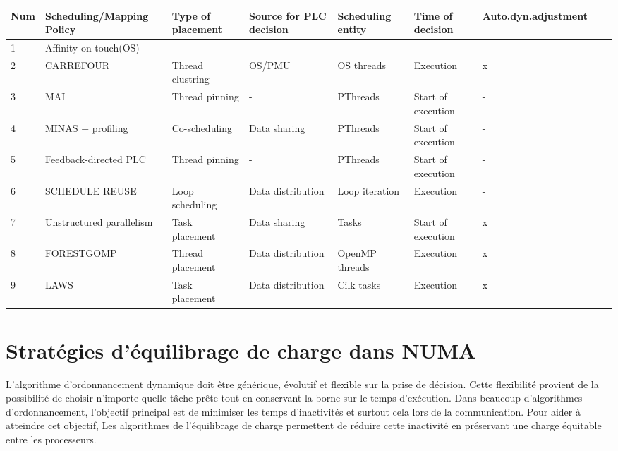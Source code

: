 {\begin{landscape}
\begin{center}
	\begin{tabular}{l *{8}{l}}
		\hline
		{Num} &     {Scheduling/Mapping Policy} &     {Type of placement} &     {Source for PLC decision} &     {Scheduling entity} &     {Time of decision} &     {Auto.dyn.adjustment}\\
		\hline
		1 		& Affinity on touch(OS)		& -    					& -      				& -     				& -      					& -\\
		2         & CARREFOUR                 	& Thread clustring   	& OS/PMU     		& OS threads     	& Execution     		& x\\
		3         & MAI                             	& Thread pinning    	& -      				& PThreads    		& Start of execution   	& -\\
		4         & MINAS + profiling              	& Co-scheduling    	& Data sharing     	& PThreads    		& Start of execution  	& -\\
		5         & Feedback-directed PLC 		& Thread pinning    	& -      				& PThreads     		& Start of execution    	& -\\
		6         & SCHEDULE REUSE            	& Loop scheduling   	& Data distribution & Loop iteration   	& Execution     		& -\\
		7         & Unstructured parallelism  	& Task placement 		& Data sharing 	& Tasks 			& Start of execution 	& x\\
		8        	& FORESTGOMP 			     & Thread placement	& Data distribution	& OpenMP threads	& Execution 			& x\\
		9         & LAWS 				     		& Task placement 		& Data distribution	& Cilk tasks 		& Execution 			& x\\
		\hline 
	\end{tabular}
	\label{table:TB_4_1_1}
\end{center} 
\end{landscape}
\clearpage%
}
\newpage
\section{Stratégies d'équilibrage de charge dans NUMA}\label{straECNUMA}
%
L’algorithme d’ordonnancement dynamique doit être générique, évolutif et flexible sur la prise de décision. 
Cette flexibilité provient de la possibilité de choisir n’importe quelle tâche prête tout en conservant la borne sur le temps d’exécution.
Dans beaucoup d'algorithmes d'ordonnancement, l’objectif principal est de minimiser les temps d’inactivités et surtout cela lors de la communication. Pour aider à atteindre cet objectif, Les algorithmes de l'équilibrage de charge permettent de réduire cette inactivité en préservant une charge équitable entre les processeurs.

